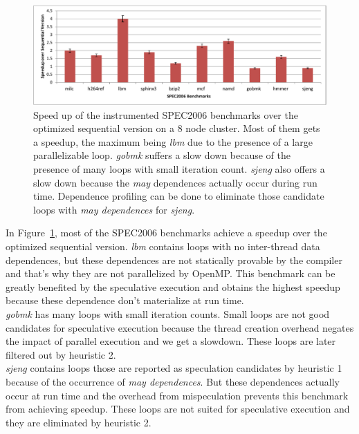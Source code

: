 \documentclass[10pt]{report}          %
\begin{document}
\begin{figure}
\begin{center}
\includegraphics[scale =0.75]{./pdf/speedup_spec2006.pdf}
\caption{Speed up of the instrumented SPEC2006 benchmarks over the optimized sequential version on a 8 node cluster. Most of them gets a speedup, the maximum being \textit{lbm} due to the presence of a large parallelizable loop. \textit{gobmk} suffers a slow down because of the presence of many loops with small iteration count. \textit{sjeng} also offers a slow down because the \textit{may} dependences actually occur during run time. Dependence profiling can be done to eliminate those candidate loops with \textit{may dependences} for \textit{sjeng}.}
\end{center}
\label{fig:speedup_spec2006}
\end{figure}

In Figure~\ref{fig:speedup_spec2006}, most of the SPEC2006 benchmarks achieve a speedup over the optimized sequential version.  \textit{lbm} contains loops with no inter-thread data dependences, but these dependences are not statically provable by the compiler and that's why they are not parallelized by OpenMP. This benchmark can be greatly benefited by the speculative execution and obtains the highest speedup because these dependence don't materialize at run time.\\

\textit{gobmk} has many loops with small iteration counts. Small loops are not good candidates for speculative execution because the thread creation overhead negates the impact of parallel execution and we get a slowdown. These loops are later filtered out by heuristic 2.\\

\textit{sjeng} contains loops those are reported as speculation candidates by heuristic 1 because of the occurrence of \textit{may dependences}.  But these dependences actually occur at run time and the overhead from mispeculation prevents this benchmark from achieving speedup.  These loops are not suited for speculative execution and they are eliminated by heuristic 2.\\
\end{document}

